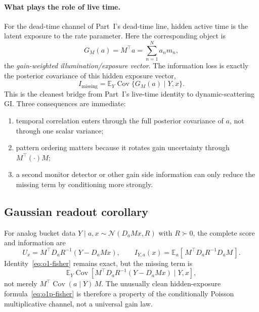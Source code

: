 \documentclass[11pt]{article}
\newcommand{\Cov}{\operatorname{Cov}}
\newcommand{\E}{\mathbb{E}}
\theoremstyle{remark}
\begin{document}
\paragraph{What plays the role of live time.}
For the dead-time channel of Part~I's dead-time line, hidden active time is the
latent exposure to the rate parameter. Here the corresponding object is
\begin{equation}
G_M(a) = M^\top a = \sum_{n=1}^N a_n m_n,
\tag{O1.5}\label{eq:o1p-exposure}
\end{equation}
the \emph{gain-weighted illumination/exposure vector}. The information loss is
exactly the posterior covariance of this hidden exposure vector,
\begin{equation*}
I_{\mathrm{missing}} = \E_Y \Cov\{ G_M(a)\mid Y,x \}.
\end{equation*}
This is the cleanest bridge from Part~I's live-time identity to
dynamic-scattering GI. Three consequences are immediate:
\begin{enumerate}
\item temporal correlation enters through the full posterior covariance of $a$,
not through one scalar variance;
\item pattern ordering matters because it rotates gain uncertainty through
$M^\top(\cdot)M$;
\item a second monitor detector or other gain side information can only reduce
the missing term by conditioning more strongly.
\end{enumerate}

\subsection{Gaussian readout corollary}
\label{sec:o1p-gauss}
For analog bucket data $Y\mid a,x \sim \mathcal N(D_a Mx, R)$ with $R\succ0$, the
complete score and information are
\begin{equation*}
U_x = M^\top D_a R^{-1}(Y - D_a Mx),
\qquad
I_{Y,a}(x) = \E_a[\, M^\top D_a R^{-1} D_a M \,].
\end{equation*}
Identity~\eqref{eq:o1-fisher} remains exact, but the missing term is
\begin{equation*}
\E_Y \Cov\!\left[ M^\top D_a R^{-1}(Y - D_a Mx) \mid Y,x \right],
\end{equation*}
not merely $M^\top \Cov(a\mid Y)\, M$. The unusually clean hidden-exposure
formula~\eqref{eq:o1p-fisher} is therefore a property of the conditionally
Poisson multiplicative channel, not a universal gain law.
\end{document}
